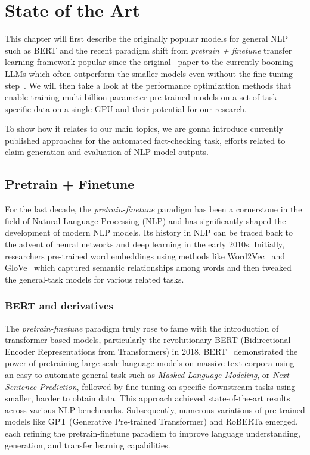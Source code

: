 
\chapter{State of the Art}

This chapter will first describe the originally popular models for general NLP such as BERT and the recent paradigm shift from \textit{pretrain + finetune} transfer learning framework popular since the original~\cite{devlin2019bert} paper to the currently booming LLMs which often outperform the smaller models even without the fine-tuning step~\cite{gpt4,llama,vicuna}. We will then take a look at the performance optimization methods that enable training multi-billion parameter pre-trained models on a set of task-specific data on a single GPU and their potential for our research. 

To show how it relates to our main topics, we are gonna introduce currently published approaches for the automated fact-checking task, efforts related to claim generation and evaluation of NLP model outputs.

\label{chap:sota}
\section{Pretrain + Finetune}
\label{sec:pretrain}
For the last decade, the \textit{pretrain-finetune} paradigm has been a cornerstone in the field of Natural Language Processing (NLP) and has significantly shaped the development of modern NLP models. Its history in NLP can be traced back to the advent of neural networks and deep learning in the early 2010s. Initially, researchers pre-trained word embeddings using methods like Word2Vec~\cite{mikolov} and GloVe~\cite{pennington-etal-2014-glove} which captured semantic relationships among words and then tweaked the general-task models for various related tasks.

\subsection{BERT and derivatives}
The \textit{pretrain-finetune} paradigm truly rose to fame with the introduction of transformer-based models, particularly the revolutionary BERT (Bidirectional Encoder Representations from Transformers) in 2018. BERT~\cite{devlin2019bert} demonstrated the power of pretraining large-scale language models on massive text corpora using an easy-to-automate general task such as \textit{Masked Language Modeling}, or \textit{Next Sentence Prediction}, followed by fine-tuning on specific downstream tasks using smaller, harder to obtain data. This approach achieved state-of-the-art results across various NLP benchmarks. Subsequently, numerous variations of pre-trained models like GPT (Generative Pre-trained Transformer) and RoBERTa emerged, each refining the pretrain-finetune paradigm to improve language understanding, generation, and transfer learning capabilities. 

